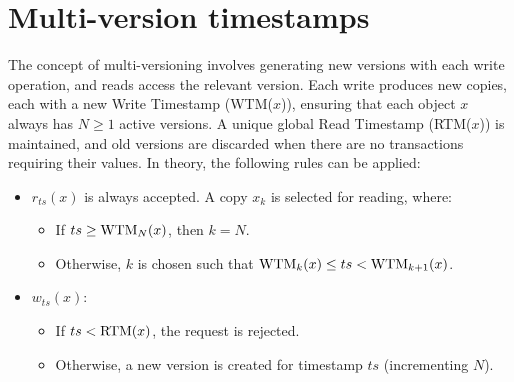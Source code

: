 \section{Multi-version timestamps}

The concept of multi-versioning involves generating new versions with each write operation, and reads access the relevant version.
Each write produces new copies, each with a new Write Timestamp (WTM($x$)), ensuring that each object $x$ always has $N \geq 1$ active versions.
A unique global Read Timestamp (RTM($x$)) is maintained, and old versions are discarded when there are no transactions requiring their values.
In theory, the following rules can be applied:
\begin{itemize}
    \item $r_{ts}(x)$ is always accepted. A copy $x_k$ is selected for reading, where:
        \begin{itemize}
            \item If $ts \geq \textnormal{WTM}_N(x)$, then $k=N$.
            \item Otherwise, $k$ is chosen such that $\textnormal{WTM}_k(x) \leq ts < \textnormal{WTM}_{k+1}(x)$. 
        \end{itemize}
    \item $w_{ts}(x)$: 
        \begin{itemize}
            \item If $ts < \textnormal{RTM}(x)$, the request is rejected. 
            \item  Otherwise, a new version is created for timestamp $ts$ (incrementing $N$).
        \end{itemize}
\end{itemize}
